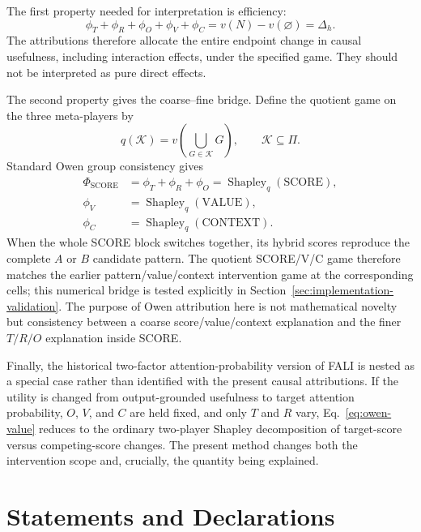 \documentclass[pdflatex,sn-mathphys-ay]{sn-jnl}
\begin{document}
The first property needed for interpretation is efficiency:
\begin{equation}
\phi_T+\phi_R+\phi_O+\phi_V+\phi_C
= v(N)-v(\varnothing)
=\Delta_h.
\label{eq:owen-efficiency}
\end{equation}
The attributions therefore allocate the entire endpoint change in causal usefulness, including interaction effects, under the specified game. They should not be interpreted as pure direct effects.

The second property gives the coarse--fine bridge. Define the quotient game on the three meta-players by
\begin{equation}
q(\mathcal{K})=v\!\left(\bigcup_{G\in\mathcal{K}}G\right),
\qquad \mathcal{K}\subseteq\Pi.
\label{eq:quotient-game}
\end{equation}
Standard Owen group consistency gives
\begin{align}
\Phi_{\mathrm{SCORE}}
&=\phi_T+\phi_R+\phi_O
=\operatorname{Shapley}_{q}(\mathrm{SCORE}), \\
\phi_V&=\operatorname{Shapley}_{q}(\mathrm{VALUE}), \\
\phi_C&=\operatorname{Shapley}_{q}(\mathrm{CONTEXT}).
\label{eq:quotient-consistency}
\end{align}
When the whole SCORE block switches together, its hybrid scores reproduce the complete $A$ or $B$ candidate pattern. The quotient SCORE/V/C game therefore matches the earlier pattern/value/context intervention game at the corresponding cells; this numerical bridge is tested explicitly in Section~\ref{sec:implementation-validation}. The purpose of Owen attribution here is not mathematical novelty but consistency between a coarse score/value/context explanation and the finer $T/R/O$ explanation inside SCORE.

Finally, the historical two-factor attention-probability version of FALI is nested as a special case rather than identified with the present causal attributions. If the utility is changed from output-grounded usefulness to target attention probability, $O$, $V$, and $C$ are held fixed, and only $T$ and $R$ vary, Eq.~\ref{eq:owen-value} reduces to the ordinary two-player Shapley decomposition of target-score versus competing-score changes. The present method changes both the intervention scope and, crucially, the quantity being explained.






\section*{Statements and Declarations}
\end{document}
